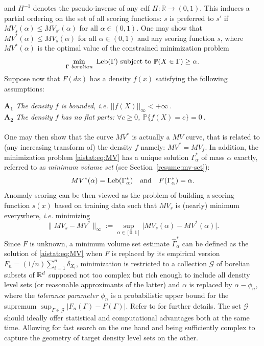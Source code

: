  and $H^{-1}$ denotes the pseudo-inverse of any cdf $H:\mathbb{R}\rightarrow (0,1)$.
%
This induces a partial ordering on the set of all scoring functions: $s$ is
preferred to $s'$ if $MV_{s}(\alpha) \le MV_{s'}(\alpha)$ for all
$\alpha\in(0,1)$.
One may show that $MV^*(\alpha)\leq MV_s(\alpha)$ for all $\alpha\in (0,1)$ and any scoring function $s$, where $MV^*(\alpha)$ is the optimal value of the constrained minimization problem
\begin{equation}\label{aistat:eq:MV}\min_{\Gamma~ borelian} ~\text{Leb}(\Gamma) \mbox{~subject to~} \mathbb{P}(X \in \Gamma) \ge \alpha.
\end{equation}
Suppose now that $F(dx)$ has a density $f(x)$ satisfying the following assumptions:

\noindent $\mathbf{A_1}$ {\it The density $f$ is bounded, \textit{i.e.} $\vert \vert f(X)\vert\vert_{\infty}<+\infty~.$} \\
\noindent $\mathbf{A_2}$ {\it The density $f$ has no flat parts: $\forall c\geq 0$, $\mathbb{P}\{f(X)=c\}=0~.$}\\~\\
 One may then show that the curve $MV^*$ is actually a $MV$ curve, that is related to (any increasing transform of) the density $f$ namely: $MV^*=MV_f$. In addition, the  minimization problem \eqref{aistat:eq:MV} has a unique solution
$\Gamma_\alpha^*$ of mass $\alpha$ exactly, referred to as \textit{minimum volume set} (see Section~\ref{resume:mv-set}): $$MV^*(\alpha)=\text{Leb}(\Gamma^*_\alpha) ~~~\text{and}~~~ F(\Gamma_\alpha^*)=\alpha .$$ Anomaly scoring can be then viewed as the problem of building a scoring function $s(x)$ based on training data such that $MV_s$ is (nearly) minimum everywhere, \textit{i.e.} minimizing $$\|MV_{s}-MV^*\|_{\infty}:=\sup_{\alpha\in[0,1]}\vert MV_s(\alpha)-MV^*(\alpha)\vert.$$
Since $F$ is unknown, a minimum volume set estimate $\widehat{\Gamma}^*_{\alpha}$ can be defined as the solution of \eqref{aistat:eq:MV} when $F$ is replaced by its empirical version
$F_n=(1/n)\sum_{i=1}^n\delta_{X_i}$, minimization is restricted to a collection $\mathcal{G}$ of borelian subsets of $\mathbb{R}^d$ supposed not too complex but rich enough to include all density level sets (or reasonable approximants of the latter) and $\alpha$ is replaced by $\alpha-\phi_n$, where the {\it tolerance parameter} $\phi_n$ is a probabilistic upper bound for the supremum $\sup_{\Gamma\in \mathcal{G}}\vert F_n(\Gamma)-F(\Gamma) \vert$. Refer to \cite{Scott2006} for further details. The set $\mathcal{G}$ should ideally offer statistical and computational advantages both at the same time. Allowing for fast search on the one hand and being sufficiently complex to capture the geometry of target density level sets on the other.
